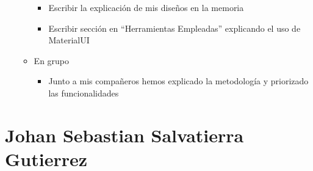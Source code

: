 \begin{itemize}
\begin{itemize}
\begin{itemize}
                \item Escribir la explicación de mis diseños en la memoria
                \item Escribir sección en “Herramientas Empleadas” explicando el uso de MaterialUI
            \end{itemize}
        \item En grupo
            \begin{itemize}
                \item Junto a mis compañeros hemos explicado la metodología y priorizado las funcionalidades
            \end{itemize}
    \end{itemize}
\end{itemize}

\section{Johan Sebastian Salvatierra Gutierrez}
